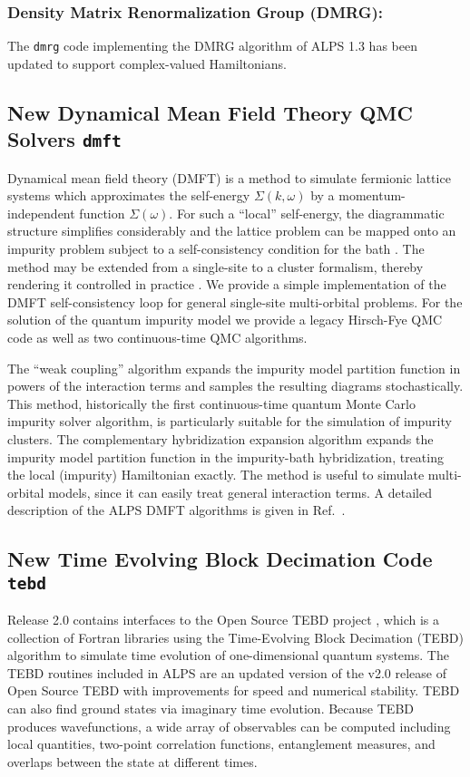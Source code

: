 \documentclass[12pt]{iopart}
\begin{document}
  
\subsubsection{Density Matrix Renormalization Group (DMRG):} The {\tt dmrg} code implementing the DMRG algorithm \cite{White1992,Schollwock2005}  of ALPS 1.3 has been updated to support complex-valued Hamiltonians.

\subsection{New Dynamical Mean Field Theory QMC Solvers {\tt dmft}}
Dynamical mean field theory (DMFT) is a method to simulate fermionic lattice systems which approximates the self-energy $\Sigma(k,\omega)$ by a momentum-independent 
function $\Sigma(\omega)$. For such a ``local'' self-energy, the diagrammatic structure simplifies considerably and the lattice problem can be mapped onto an impurity problem subject to a self-consistency condition for the bath \cite{Georges96,Kotliar06}. The method may be extended from a single-site to a cluster formalism, thereby rendering it controlled in practice \cite{Maier05}.
We provide a simple implementation of the DMFT self-consistency loop for general single-site multi-orbital problems.
For the solution of the quantum impurity model we provide a legacy Hirsch-Fye QMC code \cite{Hirsch86} as well as two continuous-time QMC algorithms.

The ``weak coupling'' algorithm \cite{Rubtsov04,Rubtsov05} expands the impurity model partition function in powers of the interaction terms and samples the resulting diagrams stochastically. This method, historically
the first continuous-time quantum Monte Carlo impurity solver algorithm, is particularly suitable for the simulation of impurity clusters.
The complementary hybridization expansion algorithm \cite{Werner06,Werner06Kondo} expands the impurity model partition function in the impurity-bath hybridization, treating 
the local (impurity) Hamiltonian exactly. 
The method is useful to simulate multi-orbital models, since it can easily treat general interaction terms. A detailed description of the ALPS DMFT algorithms is given in Ref.~\cite{ALPSDMFT}.

\subsection{New Time Evolving Block Decimation Code {\tt tebd}}
Release 2.0 contains interfaces to the Open Source TEBD project \cite{ostebd}, which is a collection of Fortran libraries using the Time-Evolving Block Decimation (TEBD) algorithm\cite{vidal1, vidal2} to simulate time evolution of one-dimensional quantum systems.  The TEBD routines included in ALPS are an updated version of the v2.0 release of Open Source TEBD with improvements for speed and numerical stability.  TEBD can also find ground states via imaginary time evolution.  Because TEBD produces wavefunctions, a wide array of observables can be computed including local quantities, two-point correlation functions, entanglement measures, and overlaps between the state at different times.
\end{document}
